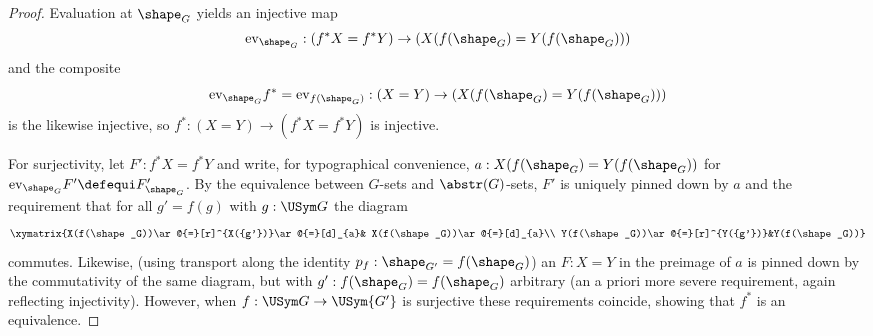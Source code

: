 \begin{proof}
  Evaluation at $\shape_G$  yields an injective map
$$\mathrm{ev}_{\shape_G}:(f^*X=f^*Y)\to(X(f(\shape_G)=Y(f(\shape_G)))$$ and the composite
$$\mathrm{ev}_{\shape_G}f^*=\mathrm{ev}_{f(\shape_G)}:(X=Y)\to(X(f(\shape_G)=Y(f(\shape_G)))$$
 is the likewise injective, so $f^*:(X=Y)\to(f^*X=f^*Y)$ is injective.

For surjectivity, let $F':f^*X=f^*Y$ and write, for typographical convenience, $a:X(f(\shape_G)=Y(f(\shape_G))$ for $\mathrm{ev}_{\shape_G}F'\defequi F'_{\shape_G}$.
By the equivalence between $G$-sets and $\abstr(G)$-sets, $F'$ is uniquely pinned down by $a$ and the requirement that for all $g'=f(g)$ with $g:\USym G$ the diagram
$$\xymatrix{X(f(\shape_G))\ar@{=}[r]^{X({g'})}\ar@{=}[d]_{a}&
  X(f(\shape_G))\ar@{=}[d]_{a}\\
  Y(f(\shape_G))\ar@{=}[r]^{Y({g'})}&Y(f(\shape_G))}
$$
commutes.  Likewise, (using transport along the identity $p_f:\shape_{G'}=f(\shape_G)$) an $F:X=Y$ in the preimage of $a$ is pinned down by the commutativity of the same diagram, but with $g':f(\shape_G)=f(\shape_G)$ arbitrary (an a priori more severe requirement, again reflecting injectivity).   However, when $f:\USym G\to\USym {G'}$ is surjective these requirements coincide, showing that $f^*$ is an equivalence.





\end{proof}



